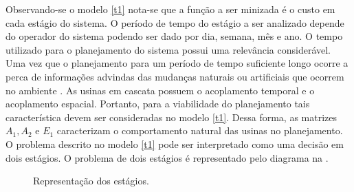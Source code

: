 Observando-se o modelo \ref{t1} nota-se que a fun\c c\~ao a ser minizada \'e o custo em cada est\'agio do sistema. O
per\'iodo de tempo do est\'agio a ser analizado
depende do operador do sistema podendo ser dado por dia, semana, m\^es e ano. O tempo
utilizado para o planejamento do sistema possui uma relev\^ancia consider\'avel. Uma vez que o planejamento para um
per\'iodo de tempo suficiente longo ocorre a perca de informa\c c\~oes advindas das mudan\c cas naturais ou artificiais
que ocorrem no ambiente \cite{tom}. As usinas em cascata possuem o acoplamento  temporal e o
acoplamento espacial. Portanto, para a viabilidade do planejamento tais caracter\'istica devem ser consideradas no
modelo \ref{t1}. Dessa forma, as matrizes $A_1, A_2$  e $E_1$ caracterizam o comportamento natural das usinas no planejamento.
O problema descrito no modelo \ref{t1} pode ser interpretado como uma decis\~ao em dois est\'agios. O problema de dois
est\'agios \'e representado pelo
diagrama na .
\begin{figure}[!h]
 \centering
\caption{Representa\c c\~ao dos est\'agios.}
 \label{estagio}
\end{figure}

